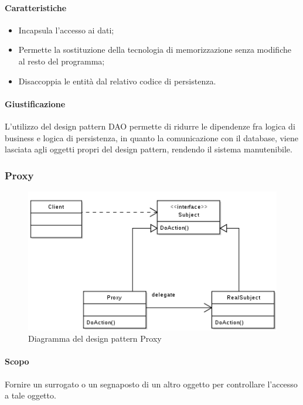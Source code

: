 \paragraph{Caratteristiche\\}
\begin{itemize}
\item Incapsula l'accesso ai dati;
\item Permette la sostituzione della tecnologia di memorizzazione senza modifiche al resto del programma;
\item Disaccoppia le entità dal relativo codice di persistenza.
\end{itemize}

\paragraph{Giustificazione\\}
L'utilizzo del design pattern\glossario{} DAO permette di ridurre le dipendenze fra logica di business e logica di persistenza, in quanto la comunicazione con il database, viene lasciata agli oggetti propri del design pattern\g{}, rendendo il sistema manutenibile.

\subsubsection{Proxy}
\label{DPProxy}
	\begin{figure}[!h]
		\centering
		\includegraphics[width=\linewidth]{./Content/Immagini/proxydp.png}
		\caption{Diagramma del design pattern Proxy}
		\label{figproxy}
	\end{figure}
	
	\paragraph{Scopo\\}
	Fornire un surrogato o un segnaposto di un altro oggetto per controllare l'accesso a tale oggetto.
	
